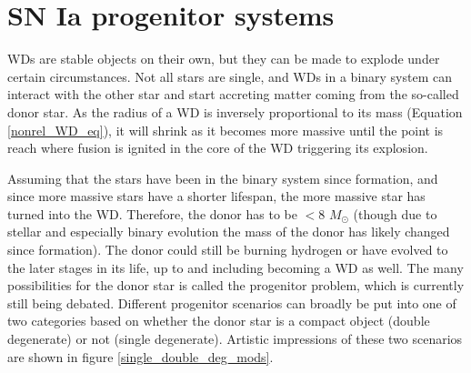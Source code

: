 \documentclass[a4paper,oneside,12pt, class=Latex/Classes/PhDthesisPSnPDF, crop=false]{standalone}
\begin{document}
\section{SN Ia progenitor systems}
\label{Ia_progenitors}
WDs are stable objects on their own, but they can be made to explode under certain circumstances. Not all stars are single, and WDs in a binary system can %
interact with the other star and start accreting matter coming from the so-called donor star. As the radius of a WD is inversely proportional to its mass (Equation \ref{nonrel_WD_eq}), it will shrink as it becomes more massive until the point is reach where fusion is ignited in the core of the WD triggering its explosion.

Assuming that the stars have been in the binary system since formation, and since more massive stars have a shorter lifespan, the more massive star has turned into the WD. Therefore, the donor has to be $<8$ $M_\odot$ (though due to stellar and especially binary evolution the mass of the donor has likely changed since formation). The donor could still be burning hydrogen or have evolved to the later stages in its life, up to and including becoming a WD as well. The many possibilities for the donor star is called the progenitor problem, which is currently still being debated. Different progenitor scenarios can broadly be put into one of two categories based on whether the donor star is a compact object (double degenerate) or not (single degenerate). Artistic impressions of these two scenarios are shown in figure \ref{single_double_deg_mods}.
\end{document}
